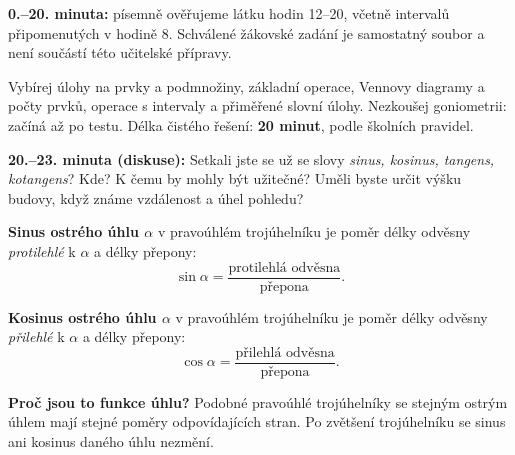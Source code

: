 \documentclass[11pt,a4paper]{article}
\begin{document}
\textbf{0.--20. minuta:} písemně ověřujeme látku hodin 12--20,
včetně intervalů připomenutých v hodině 8. Schválené žákovské zadání
je samostatný soubor a není součástí této učitelské přípravy.

\begin{zadaniBox}[title={Rámec testu – pro učitele}]
Vybírej úlohy na prvky a podmnožiny, základní operace,
Vennovy diagramy a počty prvků, operace s intervaly a přiměřené
slovní úlohy. Nezkoušej goniometrii: začíná až po testu.
Délka čistého řešení: \textbf{20 minut}, podle školních pravidel.
\end{zadaniBox}

\textbf{20.--23. minuta (diskuse):} Setkali jste se už se slovy
\emph{sinus, kosinus, tangens, kotangens}? Kde? K čemu by
mohly být užitečné? Uměli byste určit výšku budovy, když známe
vzdálenost a úhel pohledu?


\begin{definiceBox}
\textbf{Sinus ostrého úhlu $\alpha$} v pravoúhlém trojúhelníku
je poměr délky odvěsny \emph{protilehlé} k $\alpha$ a délky přepony:
\[
\sin\alpha=\frac{\text{protilehlá odvěsna}}{\text{přepona}}.
\]
\end{definiceBox}
\begin{definiceBox}
\textbf{Kosinus ostrého úhlu $\alpha$} v pravoúhlém trojúhelníku
je poměr délky odvěsny \emph{přilehlé} k $\alpha$ a délky přepony:
\[
\cos\alpha=\frac{\text{přilehlá odvěsna}}{\text{přepona}}.
\]
\end{definiceBox}

\begin{center}
\end{center}
\textbf{Proč jsou to funkce úhlu?} Podobné pravoúhlé trojúhelníky
se stejným ostrým úhlem mají stejné poměry odpovídajících stran.
Po zvětšení trojúhelníku se sinus ani kosinus daného úhlu nezmění.
\end{document}
